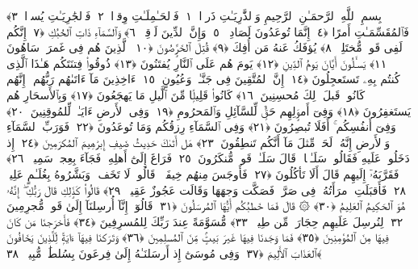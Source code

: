 
  
    
  
    
    

\nopagebreak
  بِسمِ ٱللَّهِ ٱلرَّحمَـٰنِ ٱلرَّحِيمِ
  وَٱلذَّٰرِيَـٰتِ ذَروًۭا ﴿١﴾
 فَٱلحَـٰمِلَـٰتِ وِقرًۭا ﴿٢﴾
 فَٱلجَٰرِيَـٰتِ يُسرًۭا ﴿٣﴾
 فَٱلمُقَسِّمَـٰتِ أَمرًا ﴿٤﴾
 إِنَّمَا تُوعَدُونَ لَصَادِقٌۭ ﴿٥﴾
 وَإِنَّ ٱلدِّينَ لَوَٟقِعٌۭ ﴿٦﴾
 وَٱلسَّمَآءِ ذَاتِ ٱلحُبُكِ ﴿٧﴾
 إِنَّكُم لَفِى قَولٍۢ مُّختَلِفٍۢ ﴿٨﴾
 يُؤفَكُ عَنهُ مَن أُفِكَ ﴿٩﴾
 قُتِلَ ٱلخَرَّٟصُونَ ﴿١٠﴾
 ٱلَّذِينَ هُم فِى غَمرَةٍۢ سَاهُونَ ﴿١١﴾
 يَسـَٔلُونَ أَيَّانَ يَومُ ٱلدِّينِ ﴿١٢﴾
 يَومَ هُم عَلَى ٱلنَّارِ يُفتَنُونَ ﴿١٣﴾
 ذُوقُوا۟ فِتنَتَكُم هَـٰذَا ٱلَّذِى كُنتُم بِهِۦ تَستَعجِلُونَ ﴿١٤﴾
 إِنَّ ٱلمُتَّقِينَ فِى جَنَّـٰتٍۢ وَعُيُونٍ ﴿١٥﴾
 ءَاخِذِينَ مَآ ءَاتَىٰهُم رَبُّهُم ۚ إِنَّهُم كَانُوا۟ قَبلَ ذَٟلِكَ مُحسِنِينَ ﴿١٦﴾
 كَانُوا۟ قَلِيلًۭا مِّنَ ٱلَّيلِ مَا يَهجَعُونَ ﴿١٧﴾
 وَبِٱلأَسحَارِ هُم يَستَغفِرُونَ ﴿١٨﴾
 وَفِىٓ أَموَٟلِهِم حَقٌّۭ لِّلسَّآئِلِ وَٱلمَحرُومِ ﴿١٩﴾
 وَفِى ٱلأَرضِ ءَايَـٰتٌۭ لِّلمُوقِنِينَ ﴿٢٠﴾
 وَفِىٓ أَنفُسِكُم ۚ أَفَلَا تُبصِرُونَ ﴿٢١﴾
 وَفِى ٱلسَّمَآءِ رِزقُكُم وَمَا تُوعَدُونَ ﴿٢٢﴾
 فَوَرَبِّ ٱلسَّمَآءِ وَٱلأَرضِ إِنَّهُۥ لَحَقٌّۭ مِّثلَ مَآ أَنَّكُم تَنطِقُونَ ﴿٢٣﴾
 هَل أَتَىٰكَ حَدِيثُ ضَيفِ إِبرَٰهِيمَ ٱلمُكرَمِينَ ﴿٢٤﴾
 إِذ دَخَلُوا۟ عَلَيهِ فَقَالُوا۟ سَلَـٰمًۭا ۖ قَالَ سَلَـٰمٌۭ قَومٌۭ مُّنكَرُونَ ﴿٢٥﴾
 فَرَاغَ إِلَىٰٓ أَهلِهِۦ فَجَآءَ بِعِجلٍۢ سَمِينٍۢ ﴿٢٦﴾
 فَقَرَّبَهُۥٓ إِلَيهِم قَالَ أَلَا تَأكُلُونَ ﴿٢٧﴾
 فَأَوجَسَ مِنهُم خِيفَةًۭ ۖ قَالُوا۟ لَا تَخَف ۖ وَبَشَّرُوهُ بِغُلَـٰمٍ عَلِيمٍۢ ﴿٢٨﴾
 فَأَقبَلَتِ ٱمرَأَتُهُۥ فِى صَرَّةٍۢ فَصَكَّت وَجهَهَا وَقَالَت عَجُوزٌ عَقِيمٌۭ ﴿٢٩﴾
 قَالُوا۟ كَذَٟلِكِ قَالَ رَبُّكِ ۖ إِنَّهُۥ هُوَ ٱلحَكِيمُ ٱلعَلِيمُ ﴿٣٠﴾
 ۞ قَالَ فَمَا خَطبُكُم أَيُّهَا ٱلمُرسَلُونَ ﴿٣١﴾
 قَالُوٓا۟ إِنَّآ أُرسِلنَآ إِلَىٰ قَومٍۢ مُّجرِمِينَ ﴿٣٢﴾
 لِنُرسِلَ عَلَيهِم حِجَارَةًۭ مِّن طِينٍۢ ﴿٣٣﴾
 مُّسَوَّمَةً عِندَ رَبِّكَ لِلمُسرِفِينَ ﴿٣٤﴾
 فَأَخرَجنَا مَن كَانَ فِيهَا مِنَ ٱلمُؤمِنِينَ ﴿٣٥﴾
 فَمَا وَجَدنَا فِيهَا غَيرَ بَيتٍۢ مِّنَ ٱلمُسلِمِينَ ﴿٣٦﴾
 وَتَرَكنَا فِيهَآ ءَايَةًۭ لِّلَّذِينَ يَخَافُونَ ٱلعَذَابَ ٱلأَلِيمَ ﴿٣٧﴾
 وَفِى مُوسَىٰٓ إِذ أَرسَلنَـٰهُ إِلَىٰ فِرعَونَ بِسُلطَٰنٍۢ مُّبِينٍۢ ﴿٣٨﴾

